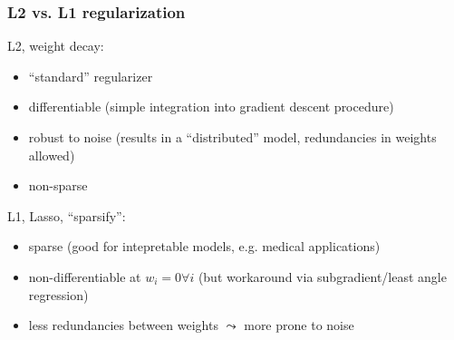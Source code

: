 \begin{frame}\frametitle{L2 vs. L1 regularization}

L2, weight decay:
\begin{itemize}
\item ``standard'' regularizer
\item differentiable (simple integration into gradient descent procedure)
\item robust to noise (results in a ``distributed'' model, redundancies in weights allowed)
\item non-sparse
\end{itemize}

\pause

L1, Lasso, ``sparsify'':

\begin{itemize}
\item sparse (good for intepretable models, e.g. medical applications)
\item non-differentiable at $w_i = 0 \forall i$ (but workaround via subgradient/least angle regression)
\item less redundancies between weights $\leadsto$ more prone to noise
\end{itemize}


\end{frame}

